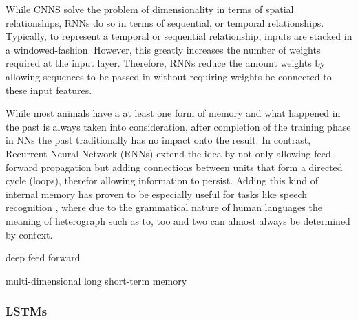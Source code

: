 While CNNS solve the problem of dimensionality in terms of spatial relationships, RNNs do so in terms of sequential, or temporal relationships.  Typically, to represent a temporal or sequential relationship, inputs are stacked in a windowed-fashion.  However, this greatly increases the number of weights required at the input layer.  Therefore, RNNs reduce the amount weights by allowing sequences to be passed in without requiring weights be connected to these input features.



While most animals have a at least one form of memory and what happened in the past is always taken into consideration, after completion of the training phase in NNs the past traditionally has no impact onto the result. 
In contrast, Recurrent Neural Network (RNNs) extend the idea by not only allowing feed-forward propagation but adding connections between units that form a directed cycle (loops), therefor allowing information to persist. 
Adding this kind of internal memory has proven to be especially useful for tasks like speech recognition \cite{sak2014long}, where due to the grammatical nature of human languages the meaning of heterograph such as to, too and two can almost always be determined by context.




deep feed forward

multi-dimensional long short-term memory 






\subsubsection{LSTMs}

